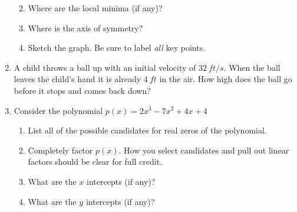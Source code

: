 \documentclass[letterpaper,12pt,fleqn]{article}
\begin{document}
\begin{enumerate}
\begin{enumerate}
    \vspace{0.5in}
    
  \item Where are the local minima (if any)?

    \vspace{0.5in}
    
  \item Where is the axis of symmetry?

    \vspace{0.5in}
    
  \item Sketch the graph. Be sure to label \emph{all} key points.

    \bigskip

    \begin{figure}[h]
      \setlength{\leftskip}{1in}
    \end{figure}
  \end{enumerate}

  \newpage

\item A child throws a ball up with an initial velocity of $\SI{32}{ft/s}$.
  When the ball leaves the child's hand it is already $\SI{4}{ft}$ in the air.
  How high does the ball go before it stops and comes back down?

  \newpage

\item Consider the polynomial $p(x)=2x^3-7x^2+4x+4$
  \begin{enumerate}
  \item List all of the possible candidates for real zeros of the polynomial.

    \vspace{2in}
    
  \item Completely factor $p(x)$. How you select candidates and pull out
    linear factors should be clear for full credit.

    \newpage

  \item What are the $x$ intercepts (if any)?

    \vspace{1in}
    
  \item What are the $y$ intercepts (if any)?


\end{enumerate}
\end{enumerate}
\end{document}
